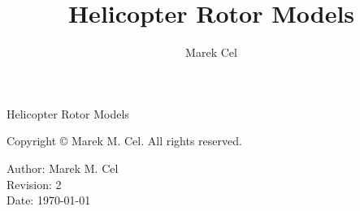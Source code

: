 \documentclass[12pt,a4paper]{report}
\title{Helicopter Rotor Models}
\author{Marek Cel}
\date{}
\begin{document}
  
  \begin{titlepage}
    \centering
    {\huge Helicopter Rotor Models\par}
  \end{titlepage}
  

  \noindent Copyright \copyright{} \the\year{} Marek M. Cel. All rights reserved.

  \noindent Author: Marek M. Cel \\
  Revision: 2 \\
  Date: \today

  
  
  {
    \clearpage
    \setlength{\parskip}{0em}
    \tableofcontents
  }\

  
  
  
  
  
  \clearpage
   
  
  
\end{document}
